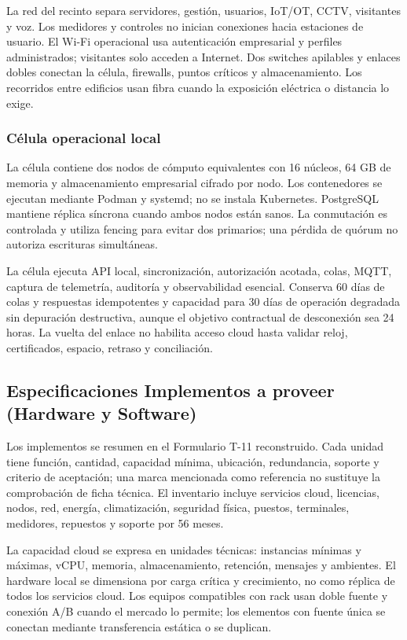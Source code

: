 \documentclass[11pt,letterpaper]{report}
\begin{document}
La red del recinto separa servidores, gestión, usuarios, IoT/OT, CCTV, visitantes y voz. Los medidores y controles no inician conexiones hacia estaciones de usuario. El Wi-Fi operacional usa autenticación empresarial y perfiles administrados; visitantes solo acceden a Internet. Dos switches apilables y enlaces dobles conectan la célula, firewalls, puntos críticos y almacenamiento. Los recorridos entre edificios usan fibra cuando la exposición eléctrica o distancia lo exige.

\subsubsection*{Célula operacional local}

La célula contiene dos nodos de cómputo equivalentes con 16 núcleos, 64 GB de memoria y almacenamiento empresarial cifrado por nodo. Los contenedores se ejecutan mediante Podman y systemd; no se instala Kubernetes. PostgreSQL mantiene réplica síncrona cuando ambos nodos están sanos. La conmutación es controlada y utiliza fencing para evitar dos primarios; una pérdida de quórum no autoriza escrituras simultáneas.

La célula ejecuta API local, sincronización, autorización acotada, colas, MQTT, captura de telemetría, auditoría y observabilidad esencial. Conserva 60 días de colas y respuestas idempotentes y capacidad para 30 días de operación degradada sin depuración destructiva, aunque el objetivo contractual de desconexión sea 24 horas. La vuelta del enlace no habilita acceso cloud hasta validar reloj, certificados, espacio, retraso y conciliación.

\subsection{Especificaciones Implementos a proveer (Hardware y Software)}

Los implementos se resumen en el Formulario T-11 reconstruido. Cada unidad tiene función, cantidad, capacidad mínima, ubicación, redundancia, soporte y criterio de aceptación; una marca mencionada como referencia no sustituye la comprobación de ficha técnica. El inventario incluye servicios cloud, licencias, nodos, red, energía, climatización, seguridad física, puestos, terminales, medidores, repuestos y soporte por 56 meses.

La capacidad cloud se expresa en unidades técnicas: instancias mínimas y máximas, vCPU, memoria, almacenamiento, retención, mensajes y ambientes. El hardware local se dimensiona por carga crítica y crecimiento, no como réplica de todos los servicios cloud. Los equipos compatibles con rack usan doble fuente y conexión A/B cuando el mercado lo permite; los elementos con fuente única se conectan mediante transferencia estática o se duplican.
\end{document}
